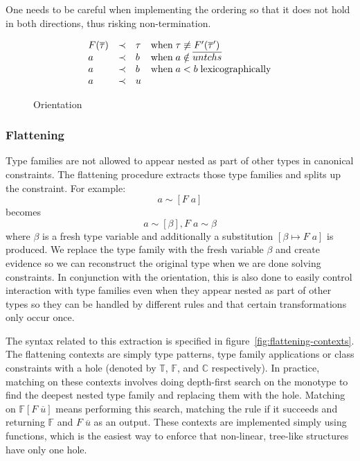 One needs to be careful when implementing the ordering so that it does not hold
in both directions, thus risking non-termination.

\begin{figure}
\[
\begin{array}{l c l l}
F(\overline{\tau}) &\prec& \tau &\text{when} \; \tau \not\equiv
F'(\overline{\tau}')
\\
a &\prec& b &\text{when} \; a \notin \overline{untchs}
\\
a &\prec& b &\text{when} \; a < b \; \text{lexicographically}
\\
a &\prec& u
\end{array}
\]
\caption{Orientation}
\label{fig:orientation}
\end{figure}

\subsubsection{Flattening}
Type families are not allowed to appear nested as part of other types in
canonical constraints. The flattening procedure extracts those type families and
splits up the constraint. For example: %
$$
a \sim [F \; a]
$$
becomes
$$
a \sim [\beta], F \; a \sim \beta
$$
where $\beta$ is a fresh type variable and additionally a substitution $[\beta
\mapsto F \; a]$ is produced. We replace the type family with the fresh variable
$\beta$ and create evidence so we can reconstruct the original type when we are
done solving constraints. In conjunction with the orientation, this is also done
to easily control interaction with type families even when they appear nested as
part of other types so they can be handled by different rules and that certain
transformations only occur once.


The syntax related to this extraction is specified in
figure~\ref{fig:flattening-contexts}. The flattening contexts are simply type
patterns, type family applications or class constraints with a hole (denoted by
$\mathbb{T}$, $\mathbb{F}$, and $\mathbb{C}$ respectively). In practice, matching
on these contexts involves doing depth-first search on the monotype to find the
deepest nested type family and replacing them with the hole. Matching on
$\mathbb{F}[F \; \overline{u}]$ means performing this search, matching the rule
if it succeeds and returning $\mathbb{F}$ and $F \; \overline{u}$ as an output.
These contexts are implemented simply using functions, which is the easiest way to
enforce that non-linear, tree-like structures have only one hole.

